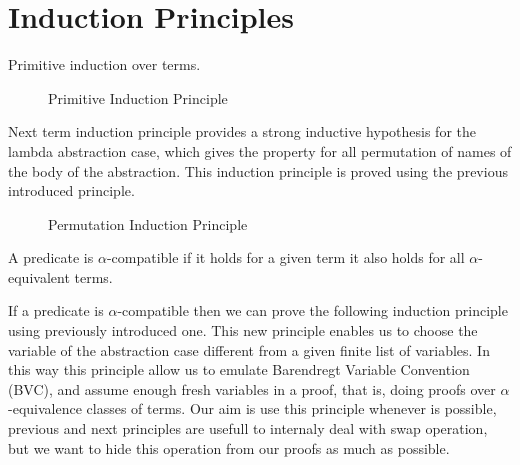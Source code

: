 \documentclass{entcs}
\newcommand{\alp}{\ensuremath{\alpha}}
\begin{document}
 \hspace{5px}

 \hspace{5px}

 \hspace{5px}


\section{Induction Principles}
\label{sec:induction}

Primitive induction over  terms.

\begin{figure}[!ht]
  \caption{Primitive Induction Principle}
\label{fig:primInd}
\end{figure}

Next term induction principle provides a strong inductive hypothesis for the lambda abstraction case, which gives the property for all permutation of names of the body of the abstraction. This induction principle is proved using the previous introduced principle.

\begin{figure}[!ht]
  \caption{Permutation Induction Principle}
\label{fig:permInd}
\end{figure}

A predicate is \alp-compatible if it holds for a given term it also holds for all \alp-equivalent terms.

 \hspace{5px}

If a predicate is \alp-compatible then we can prove the following induction principle using previously introduced one. This new principle enables us to choose the variable of the abstraction case different from a given finite list of variables. In this way this principle allow us to emulate Barendregt Variable Convention (BVC), and assume enough fresh variables in a proof, that is, doing proofs over \alp-equivalence classes of terms. Our aim is use this principle whenever is possible, previous and next principles are usefull to internaly deal with swap operation, but we want to hide this operation from our proofs as much as possible.
\end{document}
